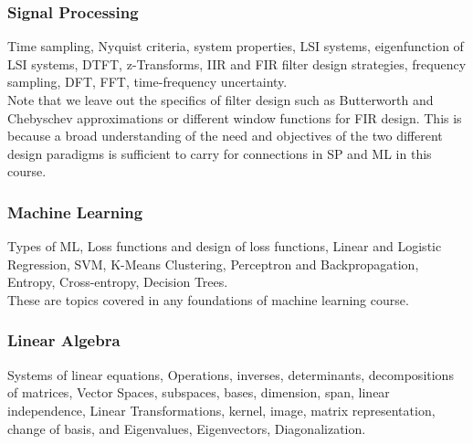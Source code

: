 \documentclass[12pt]{article}
\begin{document}
\subsubsection{Signal Processing}
Time sampling, Nyquist criteria, system properties, LSI systems, eigenfunction of LSI systems, DTFT, z-Transforms, IIR and FIR filter design strategies, frequency sampling, DFT, FFT, time-frequency uncertainty. \\
Note that we leave out the specifics of filter design such as Butterworth and Chebyschev approximations or different window functions for FIR design. This is because a broad understanding of the need and objectives of the two different design paradigms is sufficient to carry for connections in SP and ML in this course. 
\subsubsection{Machine Learning}
Types of ML, Loss functions and design of loss functions, Linear and Logistic Regression, SVM, K-Means Clustering, Perceptron and Backpropagation, Entropy, Cross-entropy, Decision Trees. \\
These are topics covered in any foundations of machine learning course.
\subsubsection{Linear Algebra}
Systems of linear equations, Operations, inverses, determinants, decompositions of matrices, Vector Spaces, subspaces, bases, dimension, span, linear independence, Linear Transformations, kernel, image, matrix representation, change of basis, and Eigenvalues, Eigenvectors, Diagonalization. 
\end{document}
